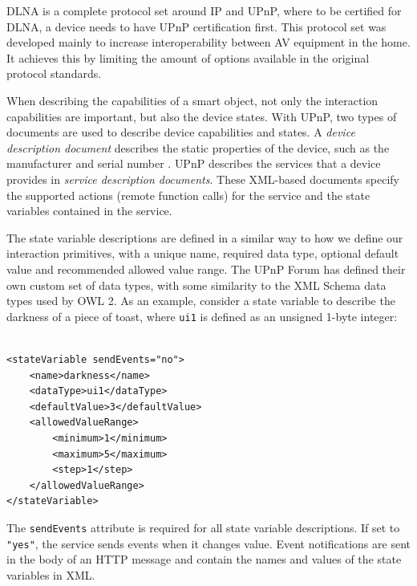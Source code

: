 \ac{DLNA} is a complete protocol set around \ac{IP} and \ac{UPnP}, where to be certified for \ac{DLNA}, a device needs to have \ac{UPnP} certification first. This protocol set was developed mainly to increase interoperability between \ac{AV} equipment in the home. It achieves this by limiting the amount of options available in the original protocol standards.

When describing the capabilities of a smart object, not only the interaction capabilities are important, but also the device states. With \ac{UPnP}, two types of documents are used to describe device capabilities and states. A \emph{device description document} describes the static properties of the device, such as the manufacturer and serial number \cite{Jeronimo2009}. \ac{UPnP} describes the services that a device provides in \emph{service description documents}. These XML-based documents specify the supported actions (remote function calls) for the service and the state variables contained in the service. 

The state variable descriptions are defined in a similar way to how we define our interaction primitives, with a unique name, required data type, optional default value and recommended allowed value range. The \ac{UPnP} Forum has defined their own custom set of data types, with some similarity to the XML Schema data types used by \ac{OWL} 2. As an example, consider a state variable to describe the darkness of a piece of toast, where \texttt{ui1} is defined as an unsigned 1-byte integer:

\begin{verbatim}
	
<stateVariable sendEvents="no">
	<name>darkness</name>
	<dataType>ui1</dataType>
	<defaultValue>3</defaultValue>
	<allowedValueRange>
		<minimum>1</minimum>
		<maximum>5</maximum>
		<step>1</step>
	</allowedValueRange>
</stateVariable>

\end{verbatim}

The \texttt{sendEvents} attribute is required for all state variable descriptions. If set to \texttt{"yes"}, the service sends events when it changes value. Event notifications are sent in the body of an HTTP message and contain the names and values of the state variables in XML. 

